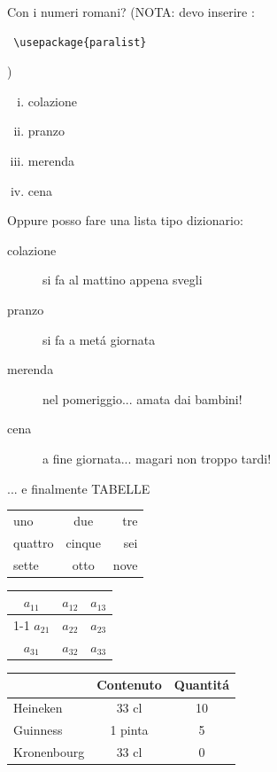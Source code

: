 \documentclass[12pt]{article}
\begin{document}
Con i numeri romani? (NOTA: devo inserire :
\begin{verbatim}
 \usepackage{paralist}
\end{verbatim})


\begin{enumerate}[(i)]
\item colazione
\item pranzo
\item merenda
\item cena
\end{enumerate}

Oppure posso fare una lista tipo dizionario:
\begin{description}
\item[colazione] si fa al mattino appena svegli
\item [pranzo] si fa a met\'a giornata
\item [merenda] nel pomeriggio... amata dai bambini!
\item [cena] a fine giornata... magari non troppo tardi!
\end{description}
\newpage
{\LARGE ... e finalmente TABELLE}

\bigskip\bigskip

\begin{tabular}{lcr}
uno & due & tre \\
quattro & cinque & sei \\
sette & otto & nove
\end{tabular}
\bigskip\bigskip


\begin{tabular}{|c|c|c|}
  \hline
  $a_{11}$ &  $a_{12}$ &  $a_{13}$ \\
  \cline{1-1}
   $a_{21}$ &  $a_{22}$ &  $a_{23}$ \\
   $a_{31}$ &  $a_{32}$ &  $a_{33}$ \\
  \hline
\end{tabular}

\bigskip\bigskip

\begin{tabular}{||p{5cm}||*{2}{c|}|}
\hline
& Contenuto & Quantit\'a \\
\hline
\hline
 Heineken & 33 cl & 10 \\
\hline
 Guinness & 1 pinta & 5 \\
\hline
 Kronenbourg & 33 cl & 0 \\
\hline
\end{tabular} 
\end{document}

